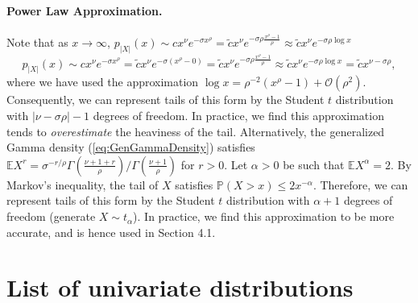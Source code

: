 \documentclass[thesis.tex]{subfiles}
\begin{document}
\paragraph{Power Law Approximation.} Note that as $x \to \infty$, $p_{|X|}(x) \sim c x^\nu e^{-\sigma x^\rho} = \tilde{c}x^\nu e^{-\sigma\rho\frac{x^\rho - 1}{\rho}} \approx \tilde{c} x^\nu e^{-\sigma\rho \log x}$
    \[
    p_{|X|}(x) \sim c x^\nu e^{-\sigma x^\rho} = \tilde{c} x^\nu e^{-\sigma(x^\rho - 0)} = \tilde{c} x^\nu e^{-\sigma\rho\frac{x^\rho - 1}{\rho}} \approx \tilde{c} x^\nu e^{-\sigma\rho \log x} = \tilde{c} x^{\nu-\sigma \rho},
    \]
    where we have used the approximation $\log x = \rho^{-2}(x^\rho - 1) + \mathcal{O}(\rho^2)$. Consequently, we can represent tails of this form by the Student $t$ distribution with $|\nu-\sigma\rho|-1$ degrees of freedom. In practice, we find this approximation tends to \emph{overestimate} the heaviness of the tail. Alternatively, the generalized Gamma density (\ref{eq:GenGammaDensity}) satisfies $\mathbb{E}X^r = \sigma^{-r/\rho} \Gamma(\frac{\nu+1+r}{\rho})/\Gamma(\frac{\nu+1}{\rho})$ for $r > 0$. Let $\alpha > 0$ be such that $\mathbb{E}X^\alpha = 2$. By Markov's inequality, the tail of $X$ satisfies $\mathbb{P}(X>x)\leq 2 x^{-\alpha}$. Therefore, we can represent tails of this form by the Student $t$ distribution with $\alpha+1$ degrees of freedom (generate $X \sim t_{\alpha}$). In practice, we find this approximation to be more accurate, and is hence used in Section 4.1.

\section{List of univariate distributions}
\end{document}
